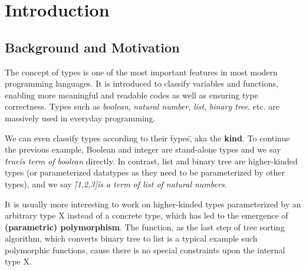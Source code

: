 \chapter{Introduction}

\section{Background and Motivation}

The concept of types is one of the most important features in most modern programming languages. It is introduced to classify variables and functions, enabling more meaningful and readable codes as well as ensuring type correctness. Types such as \textit{boolean}, \textit{natural number}, \textit{list}, \textit{binary tree}, etc. are massively used in everyday programming.

We can even classify types according to their \"types\", aka the \textbf{kind}. To continue the previous example, Boolean and integer are stand-alone types and we say \textit{\'true\' is term of boolean} directly. In contrast, list and binary tree are higher-kinded types (or parameterized datatypes as they need to be parameterized by other types), and we say \textit{\'[1,2,3]\' is a term of list of natural numbers}.

It is usually more interesting to work on higher-kinded types parameterized by an arbitrary type X instead of a concrete type, which has led to the emergence of \textbf{(parametric) polymorphism}. The  function, as the last step of tree sorting algorithm, which converts binary tree to list is a typical example such polymorphic functions, cause there is no special constraints upon the internal type X.

\begin{code}[hide]%
\>[0]\AgdaSpace{}%
\AgdaSpace{}%
\<%
\\
%
\\[\AgdaEmptyExtraSkip]%
\>[0]\AgdaSpace{}%
\AgdaSpace{}%
\AgdaSymbol{:}\AgdaSpace{}%
\<%
\\
%
\\[\AgdaEmptyExtraSkip]%
\>[0]\AgdaSpace{}%
\AgdaSpace{}%
\AgdaSymbol{(}\AgdaSpace{}%
\AgdaSymbol{:}\AgdaSpace{}%
\AgdaSymbol{)}\AgdaSpace{}%
\AgdaSymbol{:}\AgdaSpace{}%
\AgdaSpace{}%
\<%
\\
\>[0][@{}l@{\AgdaIndent{0}}]%
\>[2]\AgdaSpace{}%
\AgdaSymbol{:}\AgdaSpace{}%
\AgdaSpace{}%
\<%
\\
%
\>[2]\AgdaSpace{}%
\AgdaSymbol{:}\AgdaSpace{}%
\AgdaSpace{}%
\AgdaSpace{}%
\AgdaSpace{}%
\AgdaSpace{}%
\AgdaSpace{}%
\AgdaSpace{}%
\AgdaSpace{}%
\AgdaSpace{}%
\AgdaSpace{}%
\<%
\end{code}

